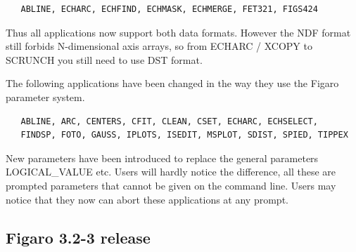 \documentclass[11pt,twoside]{article}
\begin{document}
\begin{verbatim}
   ABLINE, ECHARC, ECHFIND, ECHMASK, ECHMERGE, FET321, FIGS424
\end{verbatim}

   Thus all applications now support both data formats.  However the NDF
   format still forbids N-dimensional axis arrays, so from ECHARC /
   XCOPY to SCRUNCH you still need to use DST format.

   The following applications have been changed in the way they use the
   Figaro parameter system.

\begin{verbatim}
   ABLINE, ARC, CENTERS, CFIT, CLEAN, CSET, ECHARC, ECHSELECT,
   FINDSP, FOTO, GAUSS, IPLOTS, ISEDIT, MSPLOT, SDIST, SPIED, TIPPEX
\end{verbatim}

   New parameters have been introduced to replace the general parameters
   LOGICAL\_VALUE etc.  Users will hardly notice the difference, all
   these are prompted parameters that cannot be given on the command
   line. Users may notice that they now can abort these applications at
   any prompt.


\subsection{\label{news323}Figaro 3.2-3 release}
\end{document}
